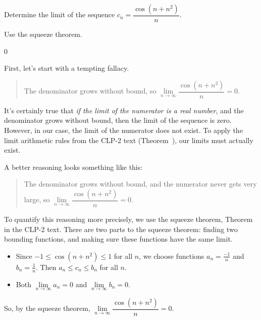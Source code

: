 \begin{Mquestion}
Determine the limit of the sequence
$c_n = \dfrac{\cos(n+n^2)}{n}$.
\end{Mquestion}
\begin{hint}
Use the squeeze theorem.
\end{hint}
\begin{answer}
0
\end{answer}
\begin{solution}
First, let's start with a  tempting fallacy.
\begin{quote}\color{red}
The denominator grows without bound, so
$\lim\limits_{n \to \infty}\dfrac{\cos(n+n^2)}{n}=0$.
\end{quote}

It's certainly true that \emph{if the limit of the numerator is a real number}, and the denominator grows without bound, then the limit of the sequence is zero. However, in our case, the limit of the numerator does not exist. To apply the limit arithmetic rules from the CLP-2 text (Theorem~), our limits must actually exist.

A better reasoning looks something like this:
\begin{quote}\color{red}
The denominator grows without bound, and the numerator never gets very large, so
$\lim\limits_{n \to \infty}\dfrac{\cos(n+n^2)}{n}=0$.
\end{quote}

To quantify this reasoning more precisely, we use the squeeze theorem, Theorem~ in the CLP-2 text. There are two parts to the squeeze theorem: finding two bounding functions, and making sure these functions have the same limit.
\begin{itemize}
\item Since $-1\leq \cos(n+n^2)\leq 1$ for all $n$, we choose functions $a_n = \frac{-1}{n}$ and $b_n = \frac{1}{n}$.  Then $a_n \leq c_n \leq b_n$ for all $n$.
\item Both $\lim\limits_{n \to \infty}a_n=0$ and  $\lim\limits_{n \to \infty}b_n=0$.
\end{itemize}
So, by the squeeze theorem, 
$\lim\limits_{n \to \infty}\dfrac{\cos(n+n^2)}{n}=0$.
\end{solution}


